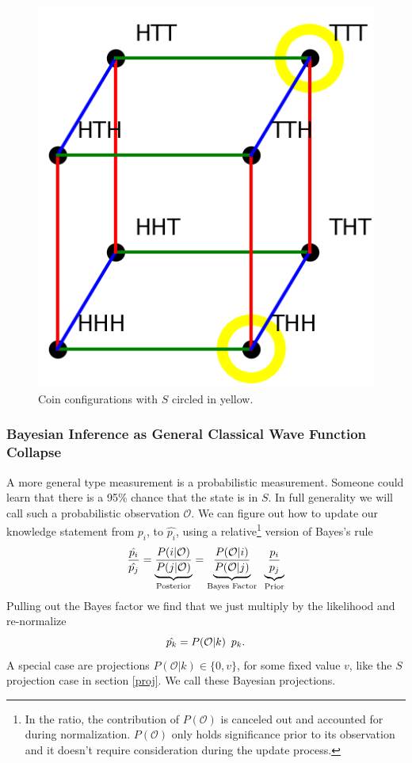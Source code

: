 \documentclass[12pt,a4paper]{article}
\begin{document}
\begin{figure}[h]
\centering
\includegraphics[scale=0.3]{cube.png}
\caption{Coin configurations with $S$ circled in yellow.}
\label{masslessshell}
\end{figure}


\subsubsection{Bayesian Inference as General Classical Wave Function Collapse}
A more general type measurement is a probabilistic measurement.  Someone could learn that there is a 95\% chance that the state is in $S$.  In full generality we will call such a probabilistic observation $\mathcal{O}$.  We can figure out how to update our knowledge statement from $p_i$, to $\hat{p_i}$, using a relative\footnote{In the ratio, the contribution of $P(\mathcal{O})$ is canceled out and accounted for during normalization.  $P(\mathcal{O})$ only holds significance prior to its observation and it doesn't require consideration during the update process.} version of Bayes's rule
\[
  \frac{\hat{p_i}}{\hat{p_j}} = \underbrace{\frac{P(i | \mathcal{O})}{P(j | \mathcal{O})}}_\text{Posterior}
                              = \underbrace{\frac{P(\mathcal{O} | i)}{P(\mathcal{O}|j)}}_\text{Bayes Factor}  \hspace{0.07 in}  \underbrace{\frac{p_i}{p_j}}_\text{Prior}
\]
Pulling out the Bayes factor we find that we just multiply by the likelihood and re-normalize
\[
  \hat{p_k} =  P(\mathcal{O} | k) \hspace{0.07 in} p_k.
\]
A special case are projections $P(\mathcal{O} | k) \in \{0,v\}$, for some fixed value $v$, like the $S$ projection case in section \ref{proj}.  We call these Bayesian projections.
\end{document}
